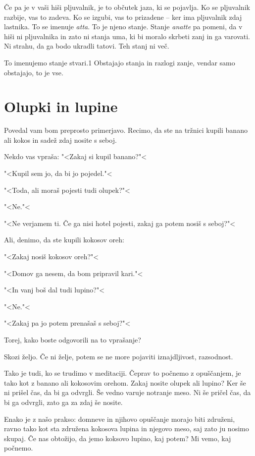 Če pa je v vaši hiši pljuvalnik, je to občutek jaza, ki se pojavlja. Ko se pljuvalnik razbije, vas to zadeva. Ko se izgubi, vas to prizadene – ker ima pljuvalnik zdaj lastnika. To se imenuje \emph{atta}. To je njeno stanje. Stanje \emph{anatte} pa pomeni, da v hiši ni pljuvalnika in zato ni stanja uma, ki bi moralo skrbeti zanj in ga varovati. Ni strahu, da ga bodo ukradli tatovi. Teh stanj ni več.

To imenujemo stanje stvari.1 Obstajajo stanja in razlogi zanje, vendar samo obstajajo, to je vse.

\section{Olupki in lupine}

Povedal vam bom preprosto primerjavo. Recimo, da ste na tržnici kupili banano ali kokos in sadež zdaj nosite s seboj.

Nekdo vas vpraša: "<Zakaj si kupil banano?"<

"<Kupil sem jo, da bi jo pojedel."<

"<Toda, ali moraš pojesti tudi olupek?"<

"<Ne."<

"<Ne verjamem ti. Če ga nisi hotel pojesti, zakaj ga potem nosiš s seboj?"<

Ali, denimo, da ste kupili kokosov oreh:

"<Zakaj nosiš kokosov oreh?"<

"<Domov ga nesem, da bom pripravil kari."<

"<In vanj boš dal tudi lupino?"<

"<Ne."<

"<Zakaj pa jo potem prenašaš s seboj?"<

Torej, kako boste odgovorili na to vprašanje?

Skozi željo. Če ni želje, potem se ne more pojaviti iznajdljivost, razsodnost.

Tako je tudi, ko se trudimo v meditaciji. Čeprav to počnemo z opuščanjem, je tako kot z banano ali kokosovim orehom. Zakaj nosite olupek ali lupino? Ker še ni prišel čas, da bi ga odvrgli. Še vedno varuje notranje meso. Ni še pričel čas, da bi ga odvrgli, zato ga za zdaj še nosite.

Enako je z našo prakso: domneve in njihovo opuščanje morajo biti združeni, ravno tako kot sta združena kokosova lupina in njegovo meso, saj zato ju nosimo skupaj. Če nas obtožijo, da jemo koksovo lupino, kaj potem? Mi vemo, kaj počnemo.

